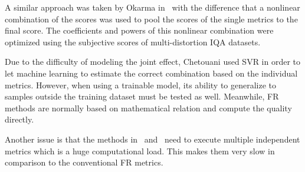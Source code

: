 A similar approach was taken by Okarma in~\cite{Okarma2014} with the difference that a nonlinear combination of the scores was used to pool the scores of the single metrics to the final score. The coefficients and powers of this nonlinear combination were optimized using the subjective scores of multi-distortion IQA datasets.

Due to the difficulty of modeling the joint effect, Chetouani used SVR in order to let machine learning to estimate the correct combination based on the individual metrics. However, when using a trainable model, its ability to generalize to samples outside the training dataset must be tested as well. Meanwhile, FR methods are normally based on mathematical relation and compute the quality directly.

Another issue is that the methods in~\cite{Chetouani2016} and~\cite{Okarma2014} need to execute multiple independent metrics which is a huge computational load. This makes them very slow in comparison to the conventional FR metrics.
